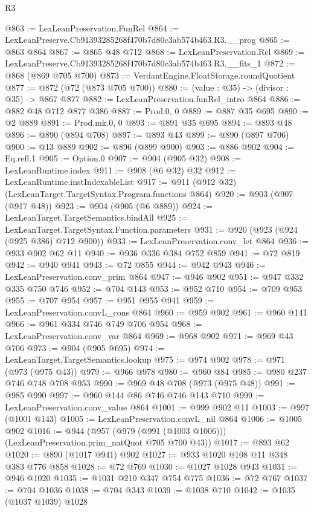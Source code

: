 \begin{lexlean}{R3}
\begin{coremodule}
@863 := LexLeanPreservation.FunRel
@864 := LexLeanPreserve.Cb91393285268f470b7d80c3ab574b463.R3.__prog
@865 := @863 @864
@867 := @865 @48 @712
@868 := LexLeanPreservation.Rel
@869 := LexLeanPreserve.Cb91393285268f470b7d80c3ab574b463.R3.__fits_1
@872 := @868 (@869 @705 @700)
@873 := VerdantEngine.FloatStorage.roundQuotient
@877 := @872 (@72 (@873 @705 @700))
@880 := (value : @35) -> (divisor : @35) -> @867 @877
@882 := LexLeanPreservation.funRel_intro @864
@886 := @882 @48 @712 @877 @386
@887 := Prod.{0, 0}
@889 := @887 @35 @695
@890 := @2 @889
@891 := Prod.mk.{0, 0}
@893 := @891 @35 @695
@894 := @893 @48
@896 := @890 (@894 @708)
@897 := @893 @43
@899 := @890 (@897 @706)
@900 := @13 @889
@902 := @896 (@899 @900)
@903 := @886 @902
@904 := Eq.refl.{1}
@905 := Option.{0}
@907 := @904 (@905 @32)
@908 := LexLeanRuntime.index
@911 := @908 (@6 @32) @32
@912 := LexLeanRuntime.instIndexableList
@917 := @911 (@912 @32) (LexLeanTarget.TargetSyntax.Program.functions @864)
@920 := @903 (@907 (@917 @48))
@923 := @904 (@905 (@6 @889))
@924 := LexLeanTarget.TargetSemantics.bindAll
@925 := LexLeanTarget.TargetSyntax.Function.parameters
@931 := @920 (@923 (@924 (@925 @386) @712 @900))
@933 := LexLeanPreservation.conv_let @864
@936 := @933 @902 @62 @11
@940 := @936 @336 @384 @752 @859
@941 := @72 @819
@942 := @940 @941
@943 := @72 @855
@944 := @942 @943
@946 := LexLeanPreservation.conv_prim @864
@947 := @946 @902
@951 := @947 @332 @335 @750 @746
@952 := @704 @143
@953 := @952 @710
@954 := @709 @953
@955 := @707 @954
@957 := @951 @955 @941
@959 := LexLeanPreservation.convL_cons @864
@960 := @959 @902
@961 := @960 @141
@966 := @961 @334 @746 @749 @706 @954
@968 := LexLeanPreservation.conv_var @864
@969 := @968 @902
@971 := @969 @43 @706
@973 := @904 (@905 @695)
@974 := LexLeanTarget.TargetSemantics.lookup
@975 := @974 @902
@978 := @971 (@973 (@975 @43))
@979 := @966 @978
@980 := @960 @84
@985 := @980 @237 @746 @748 @708 @953
@990 := @969 @48 @708 (@973 (@975 @48))
@991 := @985 @990
@997 := @960 @144 @86 @746 @746 @143 @710
@999 := LexLeanPreservation.conv_value @864
@1001 := @999 @902 @11
@1003 := @997 (@1001 @143)
@1005 := LexLeanPreservation.convL_nil @864
@1006 := @1005 @902
@1016 := @944 (@957 (@979 (@991 (@1003 @1006))) (LexLeanPreservation.prim_natQuot @705 @700 @43))
@1017 := @893 @62
@1020 := @890 (@1017 @941) @902
@1027 := @933 @1020 @108 @11 @348 @383 @776 @858
@1028 := @72 @769
@1030 := @1027 @1028 @943
@1031 := @946 @1020
@1035 := @1031 @210 @347 @754 @775
@1036 := @72 @767
@1037 := @704 @1036
@1038 := @704 @343
@1039 := @1038 @710
@1042 := @1035 (@1037 @1039) @1028

\end{coremodule}
\end{lexlean}
